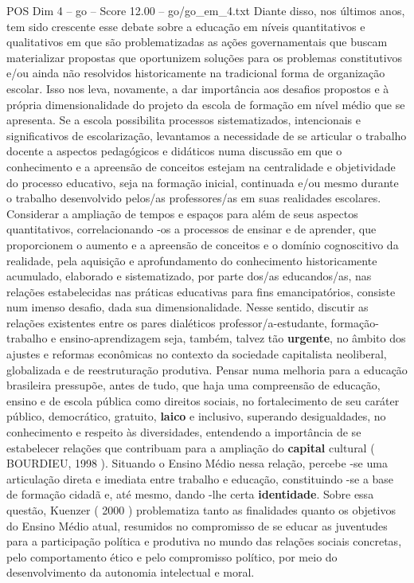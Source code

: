 \begin{textsample}{POS Dim 4 – go – Score 12.00 – go/go\_em\_4.txt}
Diante disso, nos últimos anos, tem sido crescente esse debate sobre a educação em níveis quantitativos e qualitativos em que são problematizadas as ações governamentais que buscam materializar propostas que oportunizem soluções para os problemas constitutivos e/ou ainda não resolvidos historicamente na tradicional forma de organização escolar.
Isso nos leva, novamente, a dar importância aos desafios propostos e à própria dimensionalidade do projeto da escola de formação em nível médio que se apresenta.
Se a escola possibilita processos sistematizados, intencionais e significativos de escolarização, levantamos a necessidade de se articular o trabalho docente a aspectos pedagógicos e didáticos numa discussão em que o conhecimento e a apreensão de conceitos estejam na centralidade e objetividade do processo educativo, seja na formação inicial, continuada e/ou mesmo durante o trabalho desenvolvido pelos/as professores/as em suas realidades escolares.
Considerar a ampliação de tempos e espaços para além de seus aspectos quantitativos, correlacionando -os a processos de ensinar e de aprender, que proporcionem o aumento e a apreensão de conceitos e o domínio cognoscitivo da realidade, pela aquisição e aprofundamento do conhecimento historicamente acumulado, elaborado e sistematizado, por parte dos/as educandos/as, nas relações estabelecidas nas práticas educativas para fins emancipatórios, consiste num imenso desafio, dada sua dimensionalidade.
Nesse sentido, discutir as relações existentes entre os pares dialéticos professor/a-estudante, formação-trabalho e ensino-aprendizagem seja, também, talvez tão \textbf{urgente}, no âmbito dos ajustes e reformas econômicas no contexto da sociedade capitalista neoliberal, globalizada e de reestruturação produtiva.
Pensar numa melhoria para a educação brasileira pressupõe, antes de tudo, que haja uma compreensão de educação, ensino e de escola pública como direitos sociais, no fortalecimento de seu caráter público, democrático, gratuito, \textbf{laico} e inclusivo, superando desigualdades, no conhecimento e respeito às diversidades, entendendo a importância de se estabelecer relações que contribuam para a ampliação do \textbf{capital} cultural ( BOURDIEU, 1998 ).
Situando o Ensino Médio nessa relação, percebe -se uma articulação direta e imediata entre trabalho e educação, constituindo -se a base de formação cidadã e, até mesmo, dando -lhe certa \textbf{identidade}.
Sobre essa questão, Kuenzer ( 2000 ) problematiza tanto as finalidades quanto os objetivos do Ensino Médio atual, resumidos no compromisso de se educar as juventudes para a participação política e produtiva no mundo das relações sociais concretas, pelo comportamento ético e pelo compromisso político, por meio do desenvolvimento da autonomia intelectual e moral.

\end{textsample}
